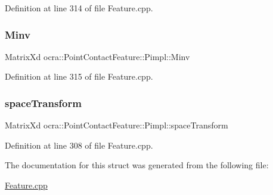 Definition at line 314 of file Feature.\+cpp.

\hypertarget{structocra_1_1PointContactFeature_1_1Pimpl_a2dfc0e883abbf6c22aace78df3677bb7}{}\label{structocra_1_1PointContactFeature_1_1Pimpl_a2dfc0e883abbf6c22aace78df3677bb7} 
\subsubsection{\texorpdfstring{Minv}{Minv}}
{\footnotesize\ttfamily Matrix\+Xd ocra\+::\+Point\+Contact\+Feature\+::\+Pimpl\+::\+Minv}



Definition at line 315 of file Feature.\+cpp.

\hypertarget{structocra_1_1PointContactFeature_1_1Pimpl_a2636a91b8abaabb52ac34a4121e9e115}{}\label{structocra_1_1PointContactFeature_1_1Pimpl_a2636a91b8abaabb52ac34a4121e9e115} 
\subsubsection{\texorpdfstring{space\+Transform}{spaceTransform}}
{\footnotesize\ttfamily Matrix\+Xd ocra\+::\+Point\+Contact\+Feature\+::\+Pimpl\+::space\+Transform}



Definition at line 308 of file Feature.\+cpp.



The documentation for this struct was generated from the following file\+:\begin{DoxyCompactItemize}
\item 
\hyperlink{Feature_8cpp}{Feature.\+cpp}\end{DoxyCompactItemize}
